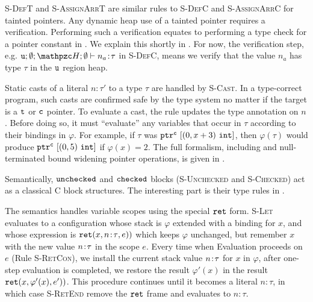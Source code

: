 \textsc{S-DefT} and \textsc{S-AssignArrT} are similar rules to \textsc{S-DefC} and \textsc{S-AssignArrC} for tainted pointers.
Any dynamic heap use of a tainted pointer requires a verification.
Performing such a verification equates to performing a type check for a pointer constant in .
We explain this shortly in .
For now, the verification step, e.g. $\umode;\emptyset;\heap ; \emptyset \vdash\evalue{n_a}{\tau}$ in \textsc{S-DefC},
means we verify that the value $n_a$ has type $\tau$ in the $\texttt{u}$ region heap.

Static casts of a literal $n\!:\!\tau'$ to a type $\tau$ are handled
by \textsc{S-Cast}. In a type-correct program, such casts are
confirmed safe by the type system no matter
if the target is a $\texttt{t}$ or $\texttt{c}$ pointer. To evaluate a cast, the rule
updates the type annotation on $n$. Before doing so, it must
``evaluate'' any variables that occur in $\tau$ according to their
bindings in $\varphi$. For example, if $\tau$ was
${\mathtt{ptr}^{\texttt{c}}~{[{({0},{x+3})}~{\mathtt{int}}]}}$, then $\varphi(\tau)$ would
produce ${\mathtt{ptr}^{\texttt{c}}~{[{({0},{5})}~{\mathtt{int}}]}}$ if $\varphi(x) = 2$.
The full formalism, including 
and null-terminated bound widening pointer operations, is given in .


%
Semantically, $\mathtt{unchecked}$ and $\mathtt{checked}$ blocks 
(\textsc{S-Unchecked} and \textsc{S-Checked}) act as a classical C block structures.
The interesting part is their type rules in .

%
The semantics handles variable scopes using the special $\mathtt{ret}$
form. \textsc{S-Let} evaluates to a configuration whose stack
is $\varphi$ extended with a binding for $x$, and whose expression is
$\mathtt{ret}({x},{{n}\!:\!{\tau}},{e}))$ which keeps $\varphi$ unchanged, but
remember $x$ with the new value ${n}\!:\!{\tau}$ in the scope $e$.
Every time when Evaluation proceeds on $e$ (Rule \textsc{S-RetCon}),
we install the current stack value ${n}\!:\!{\tau}$ for $x$ in $\varphi$,
after one-step evaluation is completed, we restore the result $\varphi'(x)$ 
in the result $\mathtt{ret}({x},{\varphi'(x)},{e'}))$.
This procedure continues until it becomes a literal
$n\!:\!\tau$, in which case \textsc{S-RetEnd} remove the $\mathtt{ret}$ frame and evaluates to
$n\!:\!\tau$. 

